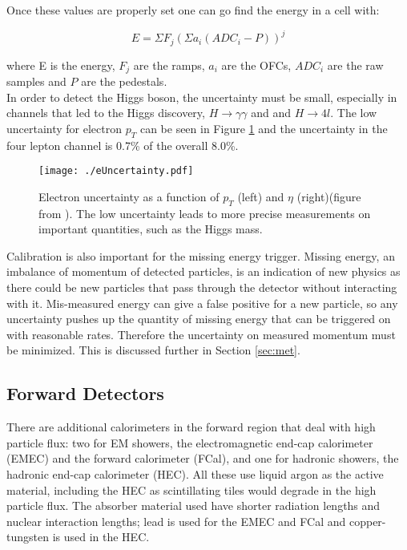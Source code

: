 Once these values are properly set one can go find the energy in a cell with:

\begin{equation}
	E=\Sigma F_{j} (\Sigma a_{i}(ADC_{i} - P))^{j}
\end{equation}

where E is the energy, $F_{j}$ are the ramps, $a_{i}$ are the OFCs, $ADC_{i}$ are the raw samples and $P$ are the pedestals.  \\

In order to detect the Higgs boson, the uncertainty must be small, especially in channels that led to the Higgs discovery, $H \rightarrow \gamma \gamma$ and and $H \rightarrow 4l$.  The low uncertainty for electron $p_{T}$ can be seen in Figure \ref{fig:euncertainty} and the uncertainty in the four lepton channel is 0.7\% of the overall 8.0\%\cite{HiggsAtlas}. \\

\begin{figure}[h!]
  \centering
	\texttt{[image: ./eUncertainty.pdf]}
\caption[Electron uncertainty as a function of $p_{T}$ and $\eta$]{\label{fig:euncertainty}{Electron uncertainty as a function of $p_{T}$ (left) and $\eta$ (right)(figure from \cite{eUncertaintyPaper}).  The low uncertainty leads to more precise measurements on important quantities, such as the Higgs mass.}} 
\end{figure}

Calibration is also important for the missing energy trigger.  Missing energy, an imbalance of momentum of detected particles, is an indication of new physics as there could be new particles that pass through the detector without interacting with it.  Mis-measured energy can give a false positive for a new particle, so any uncertainty pushes up the quantity of missing energy that can be triggered on with reasonable rates.  Therefore the uncertainty on measured momentum must be minimized.  This is discussed further in Section \ref{sec:met}.

\subsection{Forward Detectors}

There are additional calorimeters in the forward region that deal with high particle flux: two for EM showers, the electromagnetic end-cap calorimeter (EMEC) and the forward calorimeter (FCal), and one for hadronic showers, the hadronic end-cap calorimeter (HEC).  All these use liquid argon as the active material, including the HEC as scintillating tiles would degrade in the high particle flux.  The absorber material used have shorter radiation lengths and nuclear interaction lengths; lead is used for the EMEC and FCal and copper-tungsten is used in the HEC. \\


